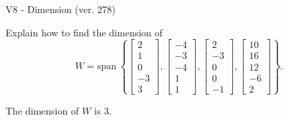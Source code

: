 \begin{exercise}
  \begin{exerciseTitle}V8 - Dimension (ver. 278)\end{exerciseTitle}
  \begin{exerciseStatement}
    Explain how to find the dimension of 
\[W=\mathrm{span}\ \left\{\left[\begin{array}{r}
2 \\
1 \\
0 \\
-3 \\
3
\end{array}\right] , \left[\begin{array}{r}
-4 \\
-3 \\
-4 \\
1 \\
1
\end{array}\right] , \left[\begin{array}{r}
2 \\
-3 \\
0 \\
0 \\
-1
\end{array}\right] , \left[\begin{array}{r}
10 \\
16 \\
12 \\
-6 \\
2
\end{array}\right]\right\}.\]



  \end{exerciseStatement}
  \begin{exerciseAnswer}
   The dimension of \(W\) is  \(3\).
  


  \end{exerciseAnswer}
\end{exercise}